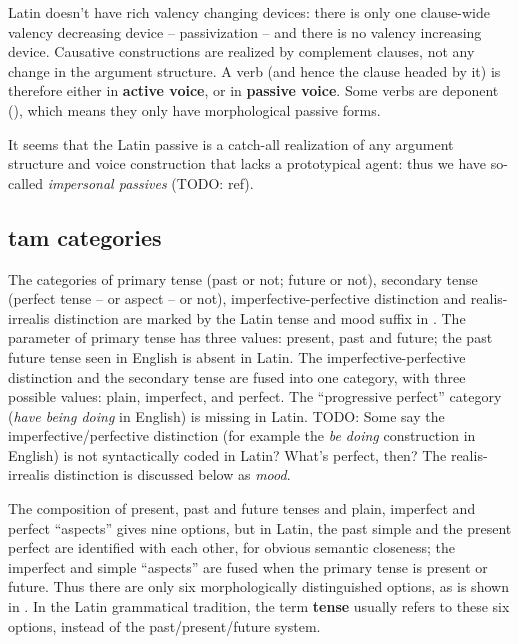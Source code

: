 \documentclass[a4paper, oneside, 12pt]{report}
\newcommand*{\concept}[1]{\textbf{#1}}
\newcommand{\form}[1]{\emph{#1}}
\begin{document}
Latin doesn't have rich valency changing devices:
there is only one clause-wide valency decreasing device -- passivization -- 
and there is no valency increasing device.
Causative constructions are realized by complement clauses,
not any change in the argument structure.
A verb (and hence the clause headed by it) is therefore either in \concept{active voice},
or in \concept{passive voice}.
Some verbs are deponent (),
which means they only have morphological passive forms.

It seems that the Latin passive is a catch-all realization of 
any argument structure and voice construction 
that lacks a prototypical agent: 
thus we have so-called \emph{impersonal passives} (TODO: ref).

\subsection{\acs{tam} categories}\label{sec:verb-inflection.finite-template.tame}

The categories of primary tense (past or not; future or not),
secondary tense (perfect tense -- or aspect -- or not),
imperfective-perfective distinction 
and realis-irrealis distinction 
are marked by the Latin tense and mood suffix in .
The parameter of primary tense has three values: 
present, past and future;
the past future tense seen in English 
is absent in Latin.
The imperfective-perfective distinction and the secondary tense 
are fused into one category,
with three possible values: 
plain, imperfect, and perfect. 
The ``progressive perfect'' category (\form{have being doing} in English)
is missing in Latin.
TODO: Some say the imperfective/perfective distinction 
(for example the \form{be doing} construction in English)
is not syntactically coded in Latin?
What's perfect, then?
The realis-irrealis distinction is discussed below as \emph{mood}.

The composition of present, past and future tenses
and plain, imperfect and perfect ``aspects''
gives nine options,
but in Latin, 
the past simple and the present perfect are identified with each other,
for obvious semantic closeness;
the imperfect and simple ``aspects'' are fused 
when the primary tense is present or future.
Thus there are only six morphologically distinguished options,
as is shown in . 
In the Latin grammatical tradition, 
the term \concept{tense} 
usually refers to these six options,
instead of the past/present/future system.
\end{document}
